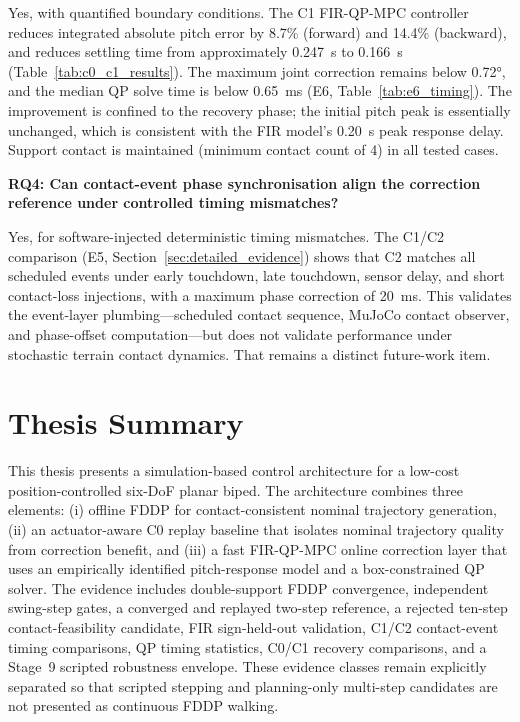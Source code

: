 \documentclass[12pt,a4paper]{report}
\begin{document}
Yes, with quantified boundary conditions. The C1 FIR-QP-MPC controller reduces integrated absolute pitch error by 8.7\% (forward) and 14.4\% (backward), and reduces settling time from approximately \SI{0.247}{\second} to \SI{0.166}{\second} (Table~\ref{tab:c0_c1_results}). The maximum joint correction remains below \ang{0.72}, and the median QP solve time is below \SI{0.65}{\milli\second} (E6, Table~\ref{tab:e6_timing}). The improvement is confined to the recovery phase; the initial pitch peak is essentially unchanged, which is consistent with the FIR model's \SI{0.20}{\second} peak response delay. Support contact is maintained (minimum contact count of 4) in all tested cases.
 
\noindent\textbf{RQ4: Can contact-event phase synchronisation align the correction reference under controlled timing mismatches?}
 
Yes, for software-injected deterministic timing mismatches. The C1/C2 comparison (E5, Section~\ref{sec:detailed_evidence}) shows that C2 matches all scheduled events under early touchdown, late touchdown, sensor delay, and short contact-loss injections, with a maximum phase correction of \SI{20}{\milli\second}. This validates the event-layer plumbing---scheduled contact sequence, MuJoCo contact observer, and phase-offset computation---but does not validate performance under stochastic terrain contact dynamics. That remains a distinct future-work item.
 
\section{Thesis Summary}
 
This thesis presents a simulation-based control architecture for a low-cost position-controlled six-DoF planar biped. The architecture combines three elements: (i) offline FDDP for contact-consistent nominal trajectory generation, (ii) an actuator-aware C0 replay baseline that isolates nominal trajectory quality from correction benefit, and (iii) a fast FIR-QP-MPC online correction layer that uses an empirically identified pitch-response model and a box-constrained QP solver. The evidence includes double-support FDDP convergence, independent swing-step gates, a converged and replayed two-step reference, a rejected ten-step contact-feasibility candidate, FIR sign-held-out validation, C1/C2 contact-event timing comparisons, QP timing statistics, C0/C1 recovery comparisons, and a Stage~9 scripted robustness envelope. These evidence classes remain explicitly separated so that scripted stepping and planning-only multi-step candidates are not presented as continuous FDDP walking.
 
\end{document}
